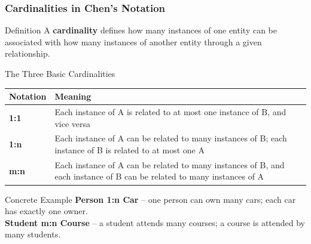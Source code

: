 \begin{frame}
  \frametitle{Cardinalities in Chen's Notation}

  \begin{block}{Definition}
    A \textbf{cardinality} defines how many instances of one entity can be associated with how many instances of another entity through a given relationship.
  \end{block}

  \begin{block}{The Three Basic Cardinalities}
    \renewcommand{\arraystretch}{1.4}
    \begin{tabular}{@{}lp{8cm}@{}}
      \toprule
      \textbf{Notation} & \textbf{Meaning} \\
      \midrule
      \textbf{1:1} & Each instance of A is related to at most one instance of B, and vice versa \\
      \textbf{1:n} & Each instance of A can be related to many instances of B; each instance of B is related to at most one A \\
      \textbf{m:n} & Each instance of A can be related to many instances of B, and each instance of B can be related to many instances of A \\
      \bottomrule
    \end{tabular}
  \end{block}

  \begin{examples}{Concrete Example}
    \textbf{Person 1:n Car} \quad -- one person can own many cars; each car has exactly one owner.\\
    \textbf{Student m:n Course} \quad -- a student attends many courses; a course is attended by many students.
  \end{examples}
\end{frame}

